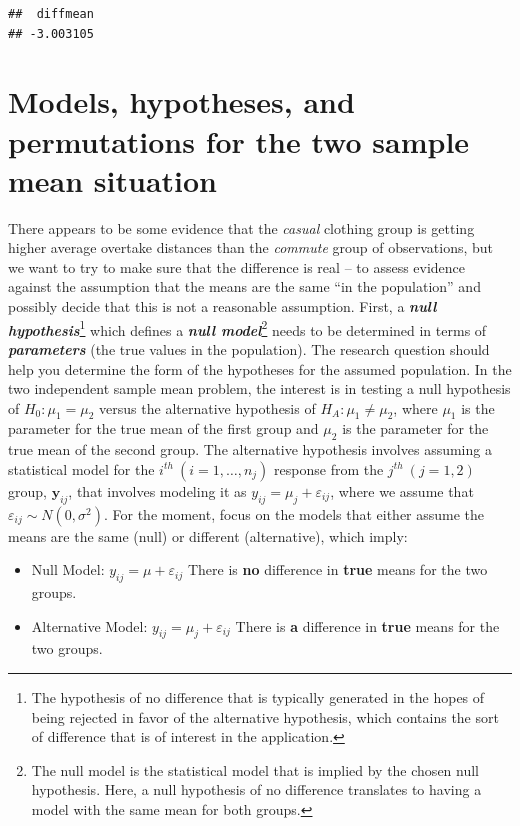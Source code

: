 \documentclass[
]{book}
\begin{document}
\begin{verbatim}
##  diffmean 
## -3.003105
\end{verbatim}

\hypertarget{section2-3}{%
\section{Models, hypotheses, and permutations for the two sample mean situation}\label{section2-3}}

There appears to be some evidence that the \emph{casual} clothing group is
getting higher average overtake distances than
the \emph{commute} group of observations, but we want to try to make sure that the difference is
real -- to assess evidence against the assumption that the means
are the same ``in the population'' and possibly decide that this is not a reasonable assumption. First, a \textbf{\emph{null hypothesis}}\footnote{The
  hypothesis of no difference that is typically generated in the hopes of
  being rejected in favor of the alternative hypothesis, which contains the sort
  of difference that is of interest in the application.} which
defines a \textbf{\emph{null model}}\footnote{The null model is the statistical model that
  is implied by the chosen null hypothesis. Here, a null hypothesis of no
  difference translates to having a model with the same mean for both groups.}
needs to be determined in terms of \textbf{\emph{parameters}} (the true values in
the population). The research question should help you determine the form of the
hypotheses for the assumed population. In the two independent sample mean
problem, the interest is in testing a null hypothesis of \(H_0: \mu_1 = \mu_2\)
versus the alternative hypothesis of \(H_A: \mu_1 \ne \mu_2\), where
\(\mu_1\) is the parameter for the true mean of the first group and \(\mu_2\)
is the parameter for the true mean of the second group. The alternative
hypothesis involves assuming a statistical model
for the \(i^{th}\ (i = 1,\ldots,n_j)\)
response from the \(j^{th}\ (j = 1,2)\) group, \(\boldsymbol{y}_{ij}\), that
involves modeling it as \(y_{ij} = \mu_j + \varepsilon_{ij}\),
where we assume that \(\varepsilon_{ij} \sim N(0,\sigma^2)\). For the moment,
focus on the models that either assume the means are the same (null) or
different (alternative),
which imply:

\begin{itemize}
\item
  Null Model: \(y_{ij} = \mu + \varepsilon_{ij}\) There is \textbf{no}
  difference in \textbf{true} means for the two groups.
\item
  Alternative Model: \(y_{ij} = \mu_j + \varepsilon_{ij}\) There is \textbf{a}
  difference in \textbf{true} means for the two groups.
\end{itemize}
\end{document}

